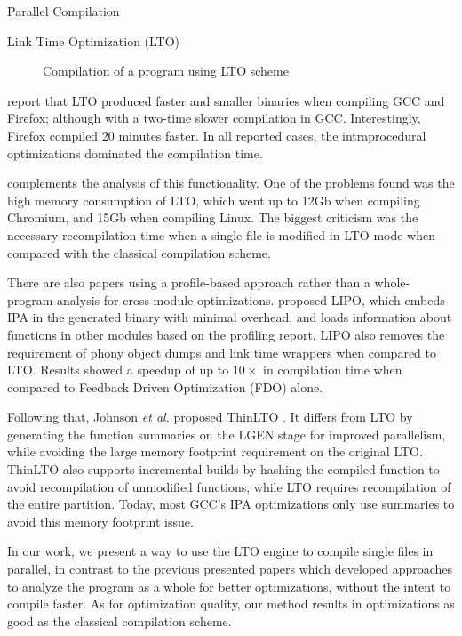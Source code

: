 \begin{section}{Parallel Compilation}
\begin{subsection}{Link Time Optimization (LTO)}
\begin{figure}
{{\begin{tikzpicture}[node distance = 3cm, auto]
\end{tikzpicture}
}
}%
\caption{Compilation of a program using LTO scheme}
\label{fig:whopr_build}
\end{figure}

\cite{glek2010optimizing} report that LTO produced faster and smaller binaries when compiling GCC
and Firefox; although with a two-time slower compilation in GCC. Interestingly,
Firefox compiled 20 minutes faster. In all reported cases, the intraprocedural
optimizations dominated the compilation time.

\cite{livska2014optimizing} complements the analysis of this functionality. One
of the problems found was the high memory consumption of LTO, which went up to
12Gb when compiling Chromium, and 15Gb when compiling Linux. The biggest
criticism was the necessary recompilation time when a single file is modified
in LTO mode when compared with the classical compilation scheme.

There are also papers using a profile-based approach rather than a
whole-program analysis for cross-module optimizations. \cite{lipo} proposed LIPO, which
embeds IPA in the generated binary with minimal overhead, and loads information
about functions in other modules based on the profiling report. LIPO also
removes the requirement of phony object dumps and link time wrappers when
compared to LTO. Results showed a speedup of up to $10\times$ in compilation
time when compared to Feedback Driven Optimization (FDO) alone.

Following that, Johnson \textit{et al.} proposed ThinLTO \citep{thinlto}. It
differs from LTO by generating the function summaries on the LGEN stage for
improved parallelism, while avoiding the large memory footprint requirement on the
original LTO. ThinLTO also supports incremental builds by hashing the compiled
function to avoid recompilation of unmodified functions, while LTO requires
recompilation of the entire partition. Today, most GCC's IPA
optimizations only use summaries to avoid this memory footprint issue.

In our work, we present a way to use the LTO engine to compile single files in
parallel, in contrast to the previous presented papers which developed
approaches to analyze the program as a whole for better optimizations, without
the intent to compile faster. As for optimization quality, our method results
in optimizations as good as the classical compilation scheme.

\end{subsection}
\end{section}

